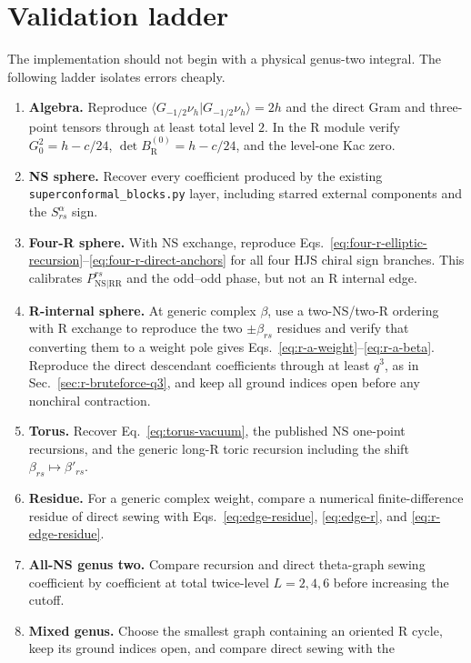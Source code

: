 \documentclass[11pt]{article}
\newcommand{\NS}{\mathrm{NS}}
\newcommand{\R}{\mathrm{R}}
\begin{document}
\section{Validation ladder}
\label{sec:tests}

The implementation should not begin with a physical genus-two integral.  The
following ladder isolates errors cheaply.
\begin{enumerate}
 \item \textbf{Algebra.} Reproduce
 $\langle G_{-1/2}\nu_h|G_{-1/2}\nu_h\rangle=2h$ and the direct Gram and
 three-point tensors through at least total level $2$.  In the R module verify
 $G_0^2=h-c/24$, $\det B_{\R}^{(0)}=h-c/24$, and the level-one Kac zero.
 \item \textbf{NS sphere.} Recover every coefficient produced by the existing
 \texttt{superconformal\_blocks.py} layer, including starred external components and
 the $S_{rs}^{\alpha}$ sign.
 \item \textbf{Four-R sphere.} With NS exchange, reproduce
 Eqs.~\eqref{eq:four-r-elliptic-recursion}--\eqref{eq:four-r-direct-anchors}
 for all four HJS chiral sign branches.  This calibrates
 $P_{\NS|\R\R}^{rs}$ and the odd--odd phase, but not an R internal edge.
 \item \textbf{R-internal sphere.} At generic complex $\beta$, use a
 two-NS/two-R ordering with R exchange to reproduce the two
 $\pm\beta_{rs}$ residues and verify that converting them to a weight pole
 gives Eqs.~\eqref{eq:r-a-weight}--\eqref{eq:r-a-beta}.  Reproduce the direct
 descendant coefficients through at least $q^3$, as in
 Sec.~\ref{sec:r-bruteforce-q3}, and keep all ground indices open before any
 nonchiral contraction.
 \item \textbf{Torus.} Recover Eq.~\eqref{eq:torus-vacuum}, the published NS
 one-point recursions, and the generic long-R toric recursion including the
 shift $\beta_{rs}\mapsto\beta'_{rs}$.
 \item \textbf{Residue.} For a generic complex weight, compare a numerical
 finite-difference residue of direct sewing with
 Eqs.~\eqref{eq:edge-residue}, \eqref{eq:edge-r}, and
 \eqref{eq:r-edge-residue}.
 \item \textbf{All-NS genus two.} Compare recursion and direct theta-graph sewing
 coefficient by coefficient at total twice-level $L=2,4,6$ before increasing
 the cutoff.
 \item \textbf{Mixed genus.} Choose the smallest graph containing an oriented
 R cycle, keep its ground indices open, and compare direct sewing with the

\end{enumerate}
\end{document}
